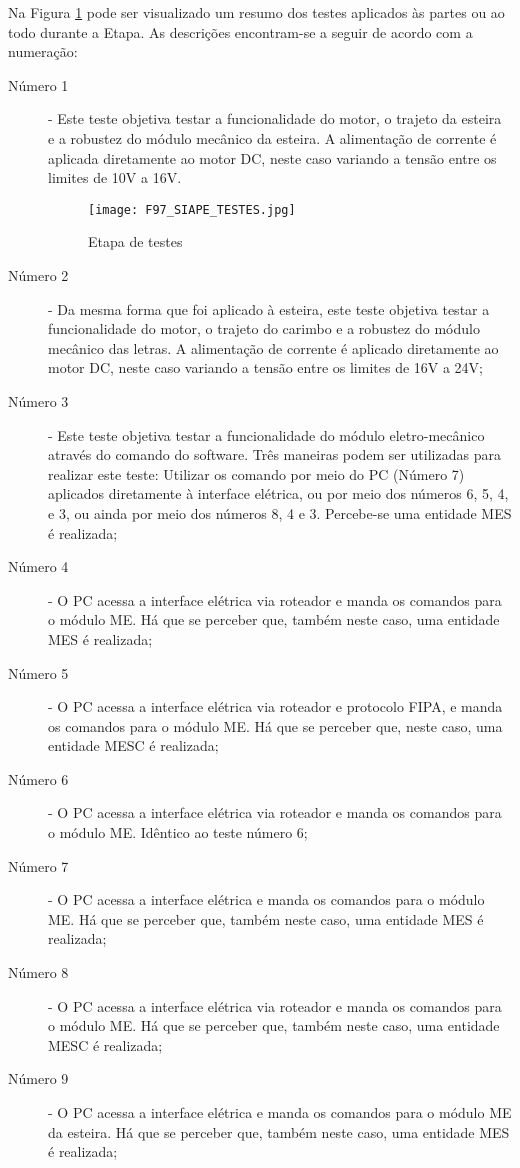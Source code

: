 Na Figura \ref{F97} pode ser visualizado um resumo dos testes aplicados às partes ou ao todo durante a Etapa. As descrições encontram-se a seguir de acordo com a numeração:
	\begin{description}
		\item[ Número 1 ] - Este teste objetiva testar a funcionalidade do motor, o trajeto da esteira e a robustez do módulo mecânico da esteira. A alimentação de corrente é aplicada diretamente ao motor DC, neste caso variando a tensão entre os limites de 10V a 16V.  

	\begin{figure}[h]
		\centering
		\texttt{[image: F97\_SIAPE\_TESTES.jpg]} 
		\caption{Etapa de testes}
		\label{F97}
	\end{figure}

	\item[ Número 2 ] - Da mesma forma que foi aplicado à esteira, este teste objetiva testar a funcionalidade do motor, o trajeto do carimbo e a robustez do módulo mecânico das letras. A alimentação de corrente é aplicado diretamente ao motor DC, neste caso variando a tensão entre os limites de 16V a 24V;

	\item[ Número 3 ] - Este teste objetiva testar a funcionalidade do módulo eletro-mecânico através do comando do software.  Três maneiras podem ser utilizadas para realizar este teste: Utilizar os comando por meio do PC (Número 7) aplicados diretamente à interface elétrica, ou por meio dos números 6, 5, 4, e 3, ou ainda por meio dos números 8, 4 e 3. Percebe-se uma entidade MES é realizada;  
	
	\item[ Número 4 ] - O PC acessa a interface elétrica via roteador e manda os comandos para o módulo ME. Há que se perceber que, também neste caso, uma entidade MES é realizada;
	
	
	\item[ Número 5 ] - O PC acessa a interface elétrica via roteador e protocolo FIPA, e manda os comandos para o módulo ME. Há que se perceber que, neste caso, uma entidade MESC é realizada;	
	
	\item[ Número 6 ] - O PC acessa a interface elétrica via roteador e manda os comandos para o módulo ME. Idêntico ao teste número 6;
	
	\item[ Número 7 ] - O PC acessa a interface elétrica e manda os comandos para o módulo ME. Há que se perceber que, também neste caso, uma entidade MES é realizada;
	
	\item[ Número 8 ] - O PC acessa a interface elétrica via roteador e manda os comandos para o módulo ME. Há que se perceber que, também neste caso, uma entidade MESC é realizada;
	
	\item[ Número 9 ] - O PC acessa a interface elétrica e manda os comandos para o módulo ME da esteira. Há que se perceber que, também neste caso, uma entidade MES é realizada;


	\end{description}
	

